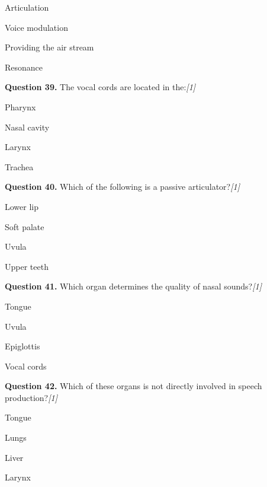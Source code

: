\documentclass[11pt,a4paper]{article}
\newcommand{\pts}[1]{\hfill   \textit{[#1]}}
\begin{document}
\begin{parts}
  \item Articulation
  \item Voice modulation
  \item Providing the air stream
  \item Resonance
\end{parts}

\medskip


\noindent   \textbf{Question 39.} The vocal cords are located in the:\pts{1}

\begin{parts}
  \item Pharynx
  \item Nasal cavity
  \item Larynx
  \item Trachea
\end{parts}

\medskip


\noindent   \textbf{Question 40.} Which of the following is a passive articulator?\pts{1}

\begin{parts}
  \item Lower lip
  \item Soft palate
  \item Uvula
  \item Upper teeth
\end{parts}

\medskip


\noindent   \textbf{Question 41.} Which organ determines the quality of nasal sounds?\pts{1}

\begin{parts}
  \item Tongue
  \item Uvula
  \item Epiglottis
  \item Vocal cords
\end{parts}

\medskip


\noindent   \textbf{Question 42.} Which of these organs is not directly involved in speech production?\pts{1}

\begin{parts}
  \item Tongue
  \item Lungs
  \item Liver
  \item Larynx
\end{parts}
\end{document}
